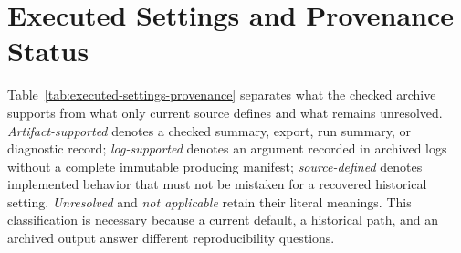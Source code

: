 \section{Executed Settings and Provenance Status}
\label{sec:experimental-design:executed-settings-provenance}

Table~\ref{tab:executed-settings-provenance} separates what the checked archive supports from what only current source defines and what remains unresolved.  \emph{Artifact-supported} denotes a checked summary, export, run summary, or diagnostic record; \emph{log-supported} denotes an argument recorded in archived logs without a complete immutable producing manifest; \emph{source-defined} denotes implemented behavior that must not be mistaken for a recovered historical setting.  \emph{Unresolved} and \emph{not applicable} retain their literal meanings.  This classification is necessary because a current default, a historical path, and an archived output answer different reproducibility questions.

